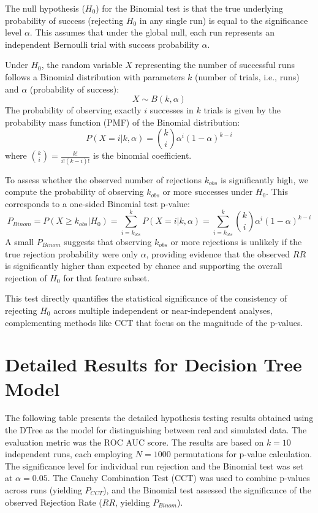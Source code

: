 \begin{appendices}
  The null hypothesis ($H_0$) for the Binomial test is that the true underlying probability of success (rejecting $H_0$ in any single run) is equal to the significance level $\alpha$. This assumes that under the global null, each run represents an independent Bernoulli trial with success probability $\alpha$.

  Under $H_0$, the random variable $X$ representing the number of successful runs follows a Binomial distribution with parameters $k$ (number of trials, i.e., runs) and $\alpha$ (probability of success):
  \begin{equation}
    X \sim B(k, \alpha)
  \end{equation}
  The probability of observing exactly $i$ successes in $k$ trials is given by the probability mass function (PMF) of the Binomial distribution:
  \begin{equation}
    P(X=i | k, \alpha) = \binom{k}{i} \alpha^i (1-\alpha)^{k-i}
    \label{eq:binom_pmf}
  \end{equation}
  where $\binom{k}{i} = \frac{k!}{i!(k-i)!}$ is the binomial coefficient.

  To assess whether the observed number of rejections $k_{obs}$ is significantly high, we compute the probability of observing $k_{obs}$ or more successes under $H_0$. This corresponds to a one-sided Binomial test p-value:
  \begin{equation}
    P_{Binom} = P(X \ge k_{obs} | H_0) = \sum_{i=k_{obs}}^{k} P(X=i | k, \alpha) = \sum_{i=k_{obs}}^{k} \binom{k}{i} \alpha^i (1-\alpha)^{k-i}
    \label{eq:binom_pvalue}
  \end{equation}
  A small $P_{Binom}$ suggests that observing $k_{obs}$ or more rejections is unlikely if the true rejection probability were only $\alpha$, providing evidence that the observed $RR$ is significantly higher than expected by chance and supporting the overall rejection of $H_0$ for that feature subset.

  This test directly quantifies the statistical significance of the consistency of rejecting $H_0$ across multiple independent or near-independent analyses, complementing methods like CCT that focus on the magnitude of the p-values.


  \section{Detailed Results for Decision Tree Model}
  \label{sec:dt_results_appendix}

  The following table presents the detailed hypothesis testing results obtained using the DTree as the model for distinguishing between real and simulated data. The evaluation metric was the ROC AUC score. The results are based on $k=10$ independent runs, each employing $N=1000$ permutations for p-value calculation. The significance level for individual run rejection and the Binomial test was set at $\alpha=0.05$. The Cauchy Combination Test (CCT) was used to combine p-values across runs (yielding $P_{CCT}$), and the Binomial test assessed the significance of the observed Rejection Rate ($RR$, yielding $P_{Binom}$).


\end{appendices}
